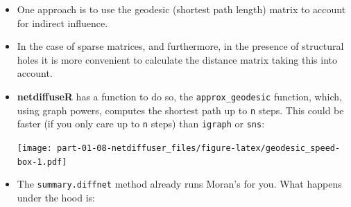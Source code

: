 \documentclass[]{book}
\newenvironment{Shaded}{\begin{snugshade}}{\end{snugshade}}
\newcommand{\CommentTok}[1]{\textcolor[rgb]{0.56,0.35,0.01}{\textit{#1}}}
\newcommand{\DataTypeTok}[1]{\textcolor[rgb]{0.13,0.29,0.53}{#1}}
\newcommand{\DecValTok}[1]{\textcolor[rgb]{0.00,0.00,0.81}{#1}}
\newcommand{\KeywordTok}[1]{\textcolor[rgb]{0.13,0.29,0.53}{\textbf{#1}}}
\newcommand{\NormalTok}[1]{#1}
\newcommand{\OperatorTok}[1]{\textcolor[rgb]{0.81,0.36,0.00}{\textbf{#1}}}
\newcommand{\StringTok}[1]{\textcolor[rgb]{0.31,0.60,0.02}{#1}}
\begin{document}
\begin{itemize}
\item
  One approach is to use the geodesic (shortest path length) matrix to account for indirect
  influence.
\item
  In the case of sparse matrices, and furthermore, in the presence of structural holes
  it is more convenient to calculate the distance matrix taking this into account.
\item
  \textbf{netdiffuseR} has a function to do so, the \texttt{approx\_geodesic} function, which,
  using graph powers, computes the shortest path up to \texttt{n} steps. This could be
  faster (if you only care up to \texttt{n} steps) than \texttt{igraph} or \texttt{sns}:

\begin{Shaded}
\end{Shaded}

  \texttt{[image: part-01-08-netdiffuser\_files/figure-latex/geodesic\_speed-box-1.pdf]}
\item
  The \texttt{summary.diffnet} method already runs Moran's for you. What happens under the hood is:

\begin{Shaded}
\end{Shaded}
\end{itemize}
\end{document}
